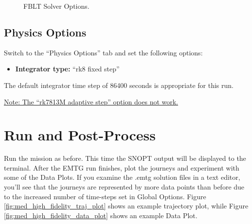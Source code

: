 \documentclass[11pt]{article}
\makeatletter
\newcommand{\knownissuelabel}[2]
{
	 \phantomsection
  	\hyperref[#2_h]{#1}\def\@currentlabel{\unexpanded{#1}}\label{#2_b}
}
\makeatother
\begin{document}
\begin{figure}[H]
	\centering
	\caption{\label{fig:med_high_fidelity_solver_options}\ac{FBLT} Solver Options.}
\end{figure}

\subsection{Physics Options}
\label{sec:med_high_fidelity_physics_options}

Switch to the ``Physics Options'' tab and set the following options:

\begin{itemize}
	\item \textbf{Integrator type:} ``rk8 fixed step''
\end{itemize}

\noindent The default integrator time step of 86400 seconds is appropriate for this run.

\noindent \knownissuelabel{Note: The “rk7813M adaptive step” option does not work.}{broken_integrator_issue} 

\section{Run and Post-Process}
\label{sec:med_high_fidelity_run_and_post_process}

Run the mission as before. This time the \acs{SNOPT} output will be displayed to the terminal. After the \ac{EMTG} run finishes, plot the journeys and experiment with some of the Data Plots. If you examine the .emtg solution files in a text editor, you’ll see that the journeys are represented by more data points than before due to the increased number of time-steps set in Global Options. Figure \ref{fig:med_high_fidelity_traj_plot} shows an example trajectory plot, while Figure \ref{fig:med_high_fidelity_data_plot} shows an example Data Plot.
\end{document}
